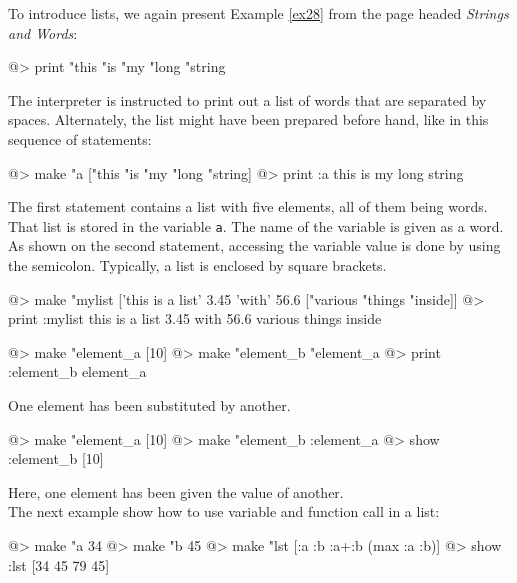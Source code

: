 To introduce lists, we again present Example \ref{ex28} from the page headed {\em Strings and Words}: 
 
\begin{verbatimtab}
@> print "this "is "my "long "string 
\end{verbatimtab}
 
The interpreter is instructed to print out a list of words that are separated by spaces.  Alternately, the list might have been prepared before hand, like in this sequence of statements: 
 
\begin{verbatimtab}
@> make "a ["this "is "my "long "string] 
@> print :a
this is my long string
\end{verbatimtab}
 
The first statement contains a list with five elements, all of them being words.  That list is stored in the variable {\tt a}. The name of the variable is given as a word. As shown on the second statement, accessing the variable value is done by using the semicolon. Typically, a list is enclosed by square brackets. 

\begin{verbatimtab} 
@> make "mylist ['this is a list' 3.45 'with' 56.6 
["various "things "inside]]
@> print :mylist
this is a list 3.45 with 56.6 various things inside
\end{verbatimtab} 
 
\begin{verbatimtab}
@> make "element_a [10] 
@> make "element_b "element_a
@> print :element_b 
element_a 
\end{verbatimtab}
 
One element has been substituted by another.
 
\begin{verbatimtab}
@> make "element_a [10] 
@> make "element_b :element_a 
@> show :element_b
[10]
\end{verbatimtab}
 
Here, one element has been given the value of another.\\ 

The next example show how to use variable and function call in a list:

\begin{verbatimtab}
@> make "a 34 
@> make "b 45 
@> make "lst [:a :b :a+:b (max :a :b)]
@> show :lst
[34 45 79 45]
\end{verbatimtab}

